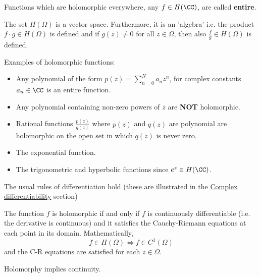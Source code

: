 \documentclass[12pt, a4paper]{article}
\begin{document}
\begin{definition}
    Functions which are holomorphic everywhere, any \(f \in H(\CC)\), are called \textbf{entire}.
\end{definition}

\begin{proposition}
    The set \(H(\Omega)\) is a vector space. Furthermore, it is an 'algebra' i.e. the product \(f \cdot g \in H(\Omega)\) is defined and if \(g(z) \neq 0\) for all \(z \in \Omega\), then also \(\frac{f}{g} \in H(\Omega)\) is defined.
\end{proposition}

\begin{mdexample}
    Examples of holomorphic functions:
    \begin{itemize}
        \item Any polynomial of the form \(p(z) = \sum_{n=0}^N a_n z^n\), for complex constants \(a_n \in \CC\) is an entire function.
        \item Any polynomial containing non-zero powers of \(\overline{z}\) are \textbf{NOT} holomorphic.
        \item Rational functions \(\frac{p(z)}{q(z)}\) where \(p(z)\) and \(q(z)\) are polynomial are holomorphic on the open set in which \(q(z)\) is never zero.
        \item The exponential function.
        \item The trigonometric and hyperbolic functions since \(e^z \in H(\CC)\).
    \end{itemize}
\end{mdexample}

\begin{theorem}
    The usual rules of differentiation hold (these are illustrated in the \hyperref[sec:C-diff]{Complex differentiability} section)
\end{theorem}

\begin{mdthm}
    The function \(f\) is holomorphic if and only if \(f\) is continuously differentiable (i.e. the derivative is continuous) and it satisfies the Cauchy-Riemann equations at each point in its domain. Mathematically,
    \[f \in H(\Omega) \iff f \in C^1(\Omega)\]
    and the C-R equations are satisfied for each \(z \in \Omega\).
\end{mdthm}

\begin{theorem}
    Holomorphy implies continuity.
\end{theorem}
\end{document}
